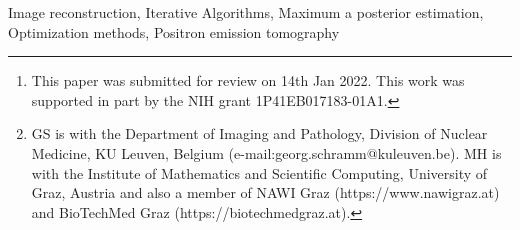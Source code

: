 \documentclass[journal,twoside,web]{ieeecolor}
\begin{document}
\title{}

\author{Georg Schramm and Martin Holler
\thanks{This paper was submitted for review on 14th Jan 2022.
This work was supported in part by the NIH grant 1P41EB017183-01A1.}
\thanks{GS is with the Department of Imaging and Pathology, Division of Nuclear Medicine,
KU Leuven, Belgium (e-mail:georg.schramm@kuleuven.be).
MH is with the Institute of Mathematics and Scientific Computing, University of Graz, Austria and
also a member of NAWI Graz (https://www.nawigraz.at) and BioTechMed Graz (https://biotechmedgraz.at).}}

\maketitle

\begin{abstract}

\end{abstract}

\begin{IEEEkeywords}
Image reconstruction, Iterative Algorithms, Maximum a posterior estimation, Optimization methods, Positron emission tomography
\end{IEEEkeywords}



\printbibliography
\end{document}
